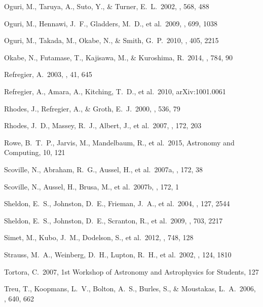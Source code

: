 \documentclass[apj]{emulateapj}
\begin{document}
\begin{thebibliography}{}
  Oguri, M., Taruya, A.,
   Suto, Y., \& Turner, E.~L.\ 2002, \apj, 568, 488

  Oguri, M., Hennawi,
J.~F., Gladders, M.~D., et al.\ 2009, \apj, 699, 1038

  Oguri, M., Takada, M.,
Okabe, N., \& Smith, G.~P.\ 2010, \mnras, 405, 2215

  Okabe, N., Futamase, T.,
  Kajisawa, M., \& Kuroshima, R.\ 2014, \apj, 784, 90

  Refregier, A.\ 2003, \araa, 41, 645
 
  Refregier, A., Amara, 
A., Kitching, T.~D., et al.\ 2010, arXiv:1001.0061 

  Rhodes, J., Refregier,
A., \& Groth, E.~J.\ 2000, \apj, 536, 79

  Rhodes, J.~D., Massey,
  R.~J., Albert, J., et al.\ 2007, \apjs, 172, 203

 Rowe, B.~T.~P.,
Jarvis, M., Mandelbaum, R., et al.\ 2015, Astronomy and Computing, 10, 121


 Scoville, N., Abraham,
R.~G., Aussel, H., et al.\ 2007a, \apjs, 172, 38


 Scoville, N., Aussel,
H., Brusa, M., et al.\ 2007b, \apjs, 172, 1


  Sheldon, E.~S.,
  Johnston, D.~E., Frieman, J.~A., et al.\ 2004, \aj, 127, 2544

  Sheldon, E.~S.,
  Johnston, D.~E., Scranton, R., et al.\ 2009, \apj, 703, 2217


  Simet, M., Kubo, J.~M.,
  Dodelson, S., et al.\ 2012, \apj, 748, 128

   Strauss, M.~A.,
Weinberg, D.~H., Lupton, R.~H., et al.\ 2002, \aj, 124, 1810

  Tortora, C.\ 2007, 1st
  Workshop of Astronomy and Astrophysics for Students, 127



 Treu, T., Koopmans, L.~V.,
  Bolton, A.~S., Burles, S., \& Moustakas, L.~A.\ 2006, \apj, 640, 662



\end{thebibliography}
\end{document}
